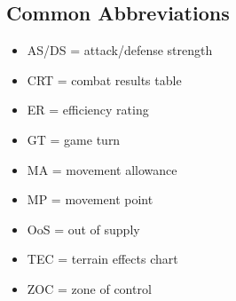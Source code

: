 \subsection{Common Abbreviations}
\begin{itemize}
  \item AS/DS = attack/defense strength
  \item CRT = combat results table
  \item ER = efficiency rating
  \item GT = game turn
  \item MA = movement allowance
  \item MP = movement point
  \item OoS = out of supply
  \item TEC = terrain effects chart
  \item ZOC = zone of control
\end{itemize}